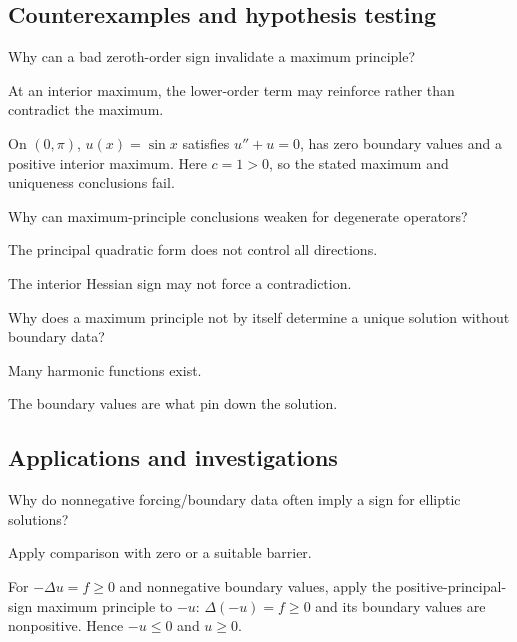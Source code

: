 \subsection*{Counterexamples and hypothesis testing}

\begin{exercise}\label{exr:iii27-expand-10}
Why can a bad zeroth-order sign invalidate a maximum principle?
\end{exercise}
\begin{hint}
At an interior maximum, the lower-order term may reinforce rather than contradict the maximum.
\end{hint}
\begin{solution}
On $(0,\pi)$, $u(x)=\sin x$ satisfies $u''+u=0$, has zero boundary values and a positive interior maximum. Here $c=1>0$, so the stated maximum and uniqueness conclusions fail.
\end{solution}

\begin{exercise}\label{exr:iii27-expand-11}
Why can maximum-principle conclusions weaken for degenerate operators?
\end{exercise}
\begin{hint}
The principal quadratic form does not control all directions.
\end{hint}
\begin{solution}
The interior Hessian sign may not force a contradiction.
\end{solution}

\begin{exercise}\label{exr:iii27-expand-12}
Why does a maximum principle not by itself determine a unique solution without boundary data?
\end{exercise}
\begin{hint}
Many harmonic functions exist.
\end{hint}
\begin{solution}
The boundary values are what pin down the solution.
\end{solution}

\subsection*{Applications and investigations}

\begin{exercise}[Positivity]\label{exr:iii27-expand-13}
Why do nonnegative forcing/boundary data often imply a sign for elliptic solutions?
\end{exercise}
\begin{hint}
Apply comparison with zero or a suitable barrier.
\end{hint}
\begin{solution}
For $-\Delta u=f\ge0$ and nonnegative boundary values, apply the positive-principal-sign maximum principle to $-u$: $\Delta(-u)=f\ge0$ and its boundary values are nonpositive. Hence $-u\le0$ and $u\ge0$.
\end{solution}

